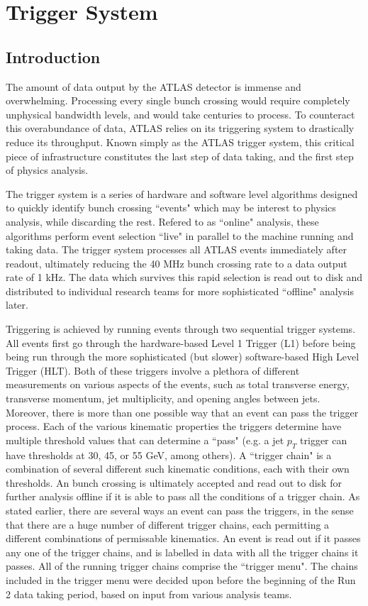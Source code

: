 \chapter{Trigger System}

\section{Introduction}
    The amount of data output by the ATLAS detector is immense and overwhelming.
    Processing every single bunch crossing would require completely unphysical bandwidth levels, and would take centuries to process.
    To counteract this overabundance of data, ATLAS relies on its triggering system to drastically reduce its throughput.
    Known simply as the ATLAS trigger system, this critical piece of infrastructure constitutes the last step of data taking, and the first step of physics analysis.

    The trigger system is a series of hardware and software level algorithms designed to quickly identify bunch crossing ``events" which may be interest to physics analysis, while discarding the rest.
    Refered to as ``online" analysis, these algorithms perform event selection ``live" in parallel to the machine running and taking data.
    The trigger system processes all ATLAS events immediately after readout, ultimately reducing the 40 MHz bunch crossing rate to a data output rate of 1 kHz.
    The data which survives this rapid selection is read out to disk and distributed to individual research teams for more sophisticated ``offline" analysis later.
    
    Triggering is achieved by running events through two sequential trigger systems.
    All events first go through the hardware-based Level 1 Trigger (L1) before being being run through the more sophisticated (but slower) software-based High Level Trigger (HLT).
    Both of these triggers involve a plethora of different measurements on various aspects of the events, such as total transverse energy, transverse momentum, jet multiplicity, and opening angles between jets.
    Moreover, there is more than one possible way that an event can pass the trigger process.
    Each of the various kinematic properties the triggers determine have multiple threshold values that can determine a ``pass" (e.g. a jet $p_T$ trigger can have thresholds at 30, 45, or 55 GeV, among others).
    A ``trigger chain" is a combination of several different such kinematic conditions, each with their own thresholds.
    An bunch crossing is ultimately accepted and read out to disk for further analysis offline if it is able to pass all the conditions of a trigger chain.
    As stated earlier, there are several ways an event can pass the triggers, in the sense that there are a huge number of different trigger chains, each permitting a different combinations of permissable kinematics.
    An event is read out if it passes any one of the trigger chains, and is labelled in data with all the trigger chains it passes.
    All of the running trigger chains comprise the ``trigger menu".
    The chains included in the trigger menu were decided upon before the beginning of the Run 2 data taking period, based on input from various analysis teams.


